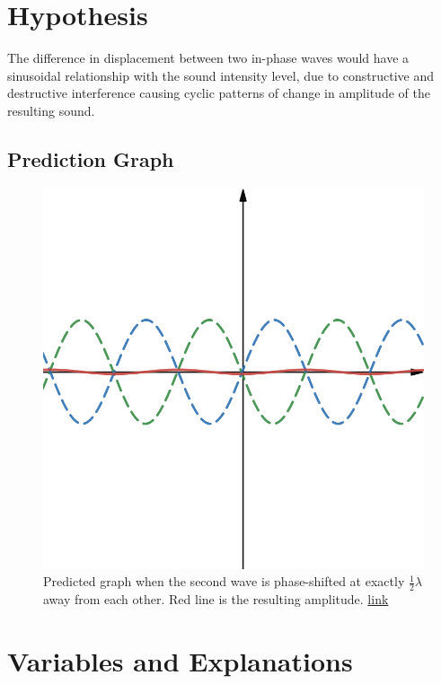 \documentclass[index]{subfiles}
\begin{document}
\section{Hypothesis}

The difference in displacement between two in-phase waves would have a sinusoidal relationship with the sound intensity level, due to constructive and destructive interference causing cyclic patterns of change in amplitude of the resulting sound.

\subsection{Prediction Graph}

\begin{figure}[H]
    \centering
    \includegraphics[scale=0.3]{prediction.png}
    \caption{Predicted graph when the second wave is phase-shifted at exactly \(\frac{1}{2}\lambda\) away from each other. Red line is the resulting amplitude. \href{https://www.desmos.com/calculator/ahmohu46il}{link}}
\end{figure}

\section{Variables and Explanations}
\end{document}
